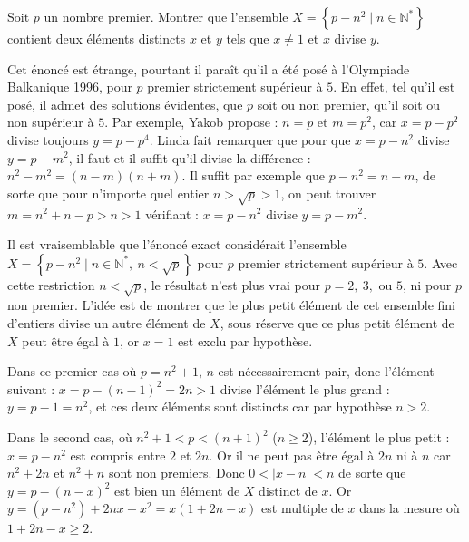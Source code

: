 \bigskip

\begin{exo}

\medskip

Soit $p$ un nombre premier. Montrer que l'ensemble $X = \left\{ p-n^2  \mid n \in \mathbb{N}^* \right\}$ contient deux éléments distincts $x$ et $y$ tels que $x \neq 1$ et $x$ divise $y$.

\end{exo}


\bigskip

\begin{sol}

\medskip

Cet énoncé est étrange, pourtant il paraît qu'il a été posé à l'Olympiade Balkanique 1996, pour $p$ premier strictement supérieur à $5$. En effet, tel qu'il est posé, il admet des solutions évidentes, que $p$ soit ou non premier, qu'il soit ou non supérieur à $5$. Par exemple, Yakob propose : $n = p$ et $m = p^2$, car $x = p - p^2$ divise toujours $y = p - p^4$. Linda fait remarquer que pour que $x = p - n^2$ divise $y = p - m^2$, il faut et il suffit qu'il divise la différence : $n^2 - m^2 = (n - m)(n+m)$. Il suffit par exemple que $p - n^2 = n - m$, de sorte que pour n'importe quel entier $n > \sqrt{p} > 1$, on peut trouver $m = n^2 + n - p > n > 1$ vérifiant : $x = p - n^2$ divise $y = p - m^2$. 

Il est vraisemblable que l'énoncé exact considérait l'ensemble $X = \left\{ p-n^2  \mid n \in \mathbb{N}^*, \ n < \sqrt{p} \right\}$ pour $p$ premier strictement supérieur à $5$. Avec cette restriction $n < \sqrt{p}$, le résultat n'est plus vrai pour $p = 2, \ 3,$ ou $5$, ni pour $p$ non premier. L'idée est de montrer que le plus petit élément de cet ensemble fini d'entiers divise un autre élément de $X$, sous réserve que ce plus petit élément de $X$ peut être égal à $1$, or $x = 1$ est exclu par hypothèse. 

Dans ce premier cas où $p = n^2 + 1$, $n$ est nécessairement pair, donc l'élément suivant : $x = p - (n-1)^2 = 2n > 1$ divise l'élément le plus grand : $y = p - 1 = n^2$, et ces deux éléments sont distincts car par hypothèse $n > 2$.

Dans le second cas, où $n^2 + 1 < p < (n+1)^2$ ($n \geq 2$), l'élément le plus petit : $x = p - n^2$ est compris entre $2$ et $2n$. Or il ne peut pas être égal à $2n$ ni à $n$ car $n^2 + 2n$ et $n^2 + n$ sont non premiers. Donc $0 < \mid x-n \mid < n$ de sorte que $y = p - (n-x)^2$ est bien un élément de $X$ distinct de $x$. Or $y = \left(p-n^2\right) + 2nx - x^2 = x(1+2n-x)$ est multiple de $x$ dans la mesure où $1+2n - x \geq 2$.

\end{sol}

